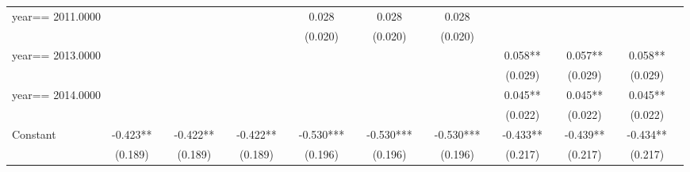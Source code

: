 \begin{table}[htbp]
\begin{tabular}{l*{18}{c}}
year==  2011.0000   &               &               &               &               &               &               &       0.028   &               &       0.028   &               &       0.028   &               &               &               &               &               &               &               \\
                    &               &               &               &               &               &               &     (0.020)   &               &     (0.020)   &               &     (0.020)   &               &               &               &               &               &               &               \\
year==  2013.0000   &               &               &               &               &               &               &               &               &               &               &               &               &       0.058** &               &       0.057** &               &       0.058** &               \\
                    &               &               &               &               &               &               &               &               &               &               &               &               &     (0.029)   &               &     (0.029)   &               &     (0.029)   &               \\
year==  2014.0000   &               &               &               &               &               &               &               &               &               &               &               &               &       0.045** &               &       0.045** &               &       0.045** &               \\
                    &               &               &               &               &               &               &               &               &               &               &               &               &     (0.022)   &               &     (0.022)   &               &     (0.022)   &               \\
Constant            &      -0.423** &               &      -0.422** &               &      -0.422** &               &      -0.530***&               &      -0.530***&               &      -0.530***&               &      -0.433** &               &      -0.439** &               &      -0.434** &               \\
                    &     (0.189)   &               &     (0.189)   &               &     (0.189)   &               &     (0.196)   &               &     (0.196)   &               &     (0.196)   &               &     (0.217)   &               &     (0.217)   &               &     (0.217)   &               \\

\end{tabular}
\end{table}
